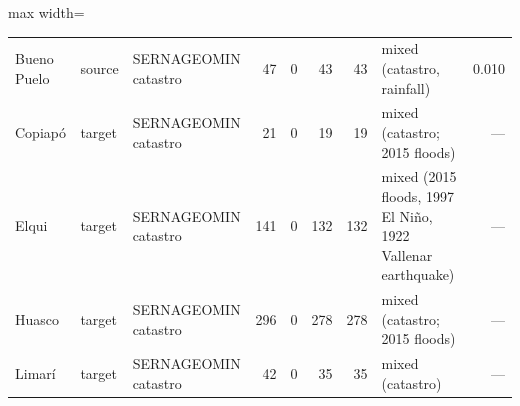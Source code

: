 \begin{table}[ht]
\begin{adjustbox}{max width=\textwidth}
\begin{tabular}{llp{3.6cm}rrrrp{3.0cm}r}
        Bueno Puelo & source & SERNAGEOMIN catastro & 47 & 0 & 43 & 43 & mixed (catastro, rainfall) & 0.010 \\
        Copiap\'o & target & SERNAGEOMIN catastro & 21 & 0 & 19 & 19 & mixed (catastro; 2015 floods) & --- \\
        Elqui & target & SERNAGEOMIN catastro & 141 & 0 & 132 & 132 & mixed (2015 floods, 1997 El Niño, 1922 Vallenar earthquake) & --- \\
        Huasco & target & SERNAGEOMIN catastro & 296 & 0 & 278 & 278 & mixed (catastro; 2015 floods) & --- \\
        Limar\'i & target & SERNAGEOMIN catastro & 42 & 0 & 35 & 35 & mixed (catastro) & --- \\
        \bottomrule
    \end{tabular}
    \end{adjustbox}
\end{table}

